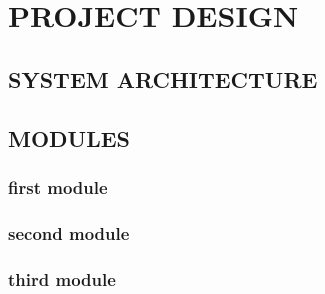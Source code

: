 \documentclass[a4paper,12pt]{report}
\begin{document}








\newpage
{}
\setcounter{page}{1}
\thispagestyle{plain}





\newpage
\tableofcontents
\newpage

\listoffigures
{}

\clearpage


\newpage
\renewcommand\thepage{\arabic{page}}
\renewcommand\thefigure{\thechapter.\arabic{figure}}
\setlength{\headheight}{15pt}
\setcounter{page}{1}




\newpage



\newpage

\chapter{PROJECT DESIGN}
\vspace{-1 cm}
\section{SYSTEM ARCHITECTURE}
\section{MODULES}
\subsection{first module}

\subsection{second module}
\subsection{third module}
\end{document}
